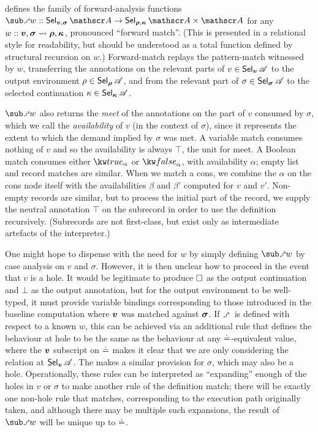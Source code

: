  defines the family of forward-analysis functions $\matchFwdF{w} :: \Sel{\raw{v}, \raw{\sigma}}{A} \to \Sel{\raw{\rho}, \raw{\kappa}}{A} \times \Ann{A}$ for any $w :: \bm{v}, \bm{\sigma} \rightsquigarrow \bm{\rho}, \bm{\kappa}$, pronounced ``forward match''. (This is presented in a relational style for readability, but should be understood as a total function defined by structural recursion on $w$.) Forward-match replays the pattern-match witnessed by $w$, transferring the annotations on the relevant parts of $v \in \textup{\textsf{Sel}}_{\bm{v}}\,{\mathscr{A}}$ to the output environment $\rho \in \textup{\textsf{Sel}}_{\bm{\rho}}\,{\mathscr{A}}$, and from the relevant part of $\sigma \in \textup{\textsf{Sel}}_{\bm{\sigma}}\,{\mathscr{A}}$ to the selected continuation $\kappa \in \textup{\textsf{Sel}}_{\bm{\kappa}}\,{\mathscr{A}}$.

$\matchFwdF{w}$ also returns the \emph{meet} of the annotations on the part of $v$ consumed by $\sigma$, which we call the \emph{availability} of $v$ (in the context of $\sigma$), since it represents the extent to which the demand implied by $\sigma$ was met. A variable match consumes nothing of $v$ and so the availability is always $\top$, the unit for meet. A Boolean match consumes either $\annot{\exTrue}{\alpha}$ or $\annot{\exFalse}{\alpha}$, with availability $\alpha$; empty list and record matches are similar. When we match a cons, we combine the $\alpha$ on the cons node itself with the availabilities $\beta$ and $\beta'$ computed for $v$ and $v'$. Non-empty records are similar, but to process the initial part of the record, we supply the neutral annotation $\top$ on the subrecord in order to use the definition recursively. (Subrecords are not first-class, but exist only as intermediate artefacts of the interpreter.)

One might hope to dispense with the need for $w$ by simply defining $\matchFwdF{w}$ by case analysis on $v$ and $\sigma$. However, it is then unclear how to proceed in the event that $v$ is a hole. It would be legitimate to produce $\square$ as the output continuation and $\bot$ as the output annotation, but for the output environment to be well-typed, it must provide variable bindings corresponding to those introduced in the baseline computation where $\bm{v}$ was matched against $\bm{\sigma}$. If $\matchFwdS$ is defined with respect to a known $w$, this can be achieved via an additional rule  that defines the behaviour at hole to be the same as the behaviour at any $\doteq$-equivalent value, where the $\bm{v}$ subscript on $\doteq$ makes it clear that we are only considering the relation at $\textup{\textsf{Sel}}_{\bm{v}}\,{\mathscr{A}}$. The  makes a similar provision for $\sigma$, which may also be a hole. Operationally, these rules can be interpreted as ``expanding'' enough of the holes in $v$ or $\sigma$ to make another rule of the definition match; there will be exactly one non-hole rule that matches, corresponding to the execution path originally taken, and although there may be multiple such expansions, the result of $\matchFwdF{w}$ will be unique up to $\doteq$.

